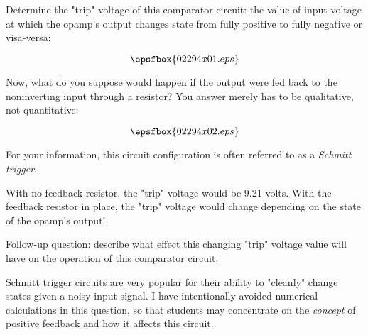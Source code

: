 

Determine the "trip" voltage of this comparator circuit: the value of input voltage at which the opamp's output changes state from fully positive to fully negative or visa-versa:

$$\epsfbox{02294x01.eps}$$

Now, what do you suppose would happen if the output were fed back to the noninverting input through a resistor?  You answer merely has to be qualitative, not quantitative:

$$\epsfbox{02294x02.eps}$$

For your information, this circuit configuration is often referred to as a {\it Schmitt trigger}.







With no feedback resistor, the "trip" voltage would be 9.21 volts.  With the feedback resistor in place, the "trip" voltage would change depending on the state of the opamp's output!

\vskip 10pt

Follow-up question: describe what effect this changing "trip" voltage value will have on the operation of this comparator circuit.







Schmitt trigger circuits are very popular for their ability to "cleanly" change states given a noisy input signal.  I have intentionally avoided numerical calculations in this question, so that students may concentrate on the {\it concept} of positive feedback and how it affects this circuit.




